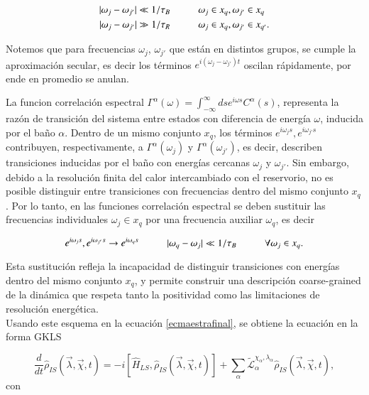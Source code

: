 \begin{align*}
    |\omega_{j}-\omega_{j'}| \ll 1/\tau_{B}  &\hspace{10mm} \omega_{j} \in x_{q}, \omega_{j'} \in x_{q} \\
    |\omega_{j}-\omega_{j'}| \gg 1/\tau_{R}  &\hspace{10mm} \omega_{j} \in x_{q}, \omega_{j'} \in x_{q'}.
\end{align*}

Notemos que para frecuencias $\omega_{j}$, $\omega_{j'}$ que están en distintos grupos, se cumple la aproximación secular, es decir los términos $e^{i(\omega_{j} - \omega_{j'})t}$ oscilan rápidamente, por ende en  promedio se anulan.

La funcion correlación  espectral $\Gamma^{\alpha}(\omega) = \int_{-\infty}^{\infty} ds e^{i \omega s} C^{\alpha}(s)$, representa la razón de transición del sistema entre estados con diferencia de energía $\omega$, inducida por el baño $\alpha$. Dentro de un mismo conjunto $x_{q}$, los términos $e^{i\omega_{j}s},e^{i\omega_{j'}s}$ contribuyen, respectivamente, a  $\Gamma^{\alpha}(\omega_{j})$ y $\Gamma^{\alpha}(\omega_{j'})$, es decir,  describen transiciones inducidas por el baño con energías cercanas $\omega_{j}$ y $\omega_{j'}$. Sin embargo, debido a la resolución finita del calor intercambiado con el reservorio, no es posible distinguir entre transiciones con frecuencias dentro del mismo conjunto $x_q$. Por lo tanto, en las funciones correlación espectral se deben sustituir las frecuencias individuales $\omega_{j} \in x_{q}$ por una frecuencia auxiliar $\omega_{q}$, es decir 

\begin{equation*}
    e^{i\omega_{j}s},e^{i\omega_{j'}s} \to e^{i\omega_{q}s} \hspace{10mm} |\omega_{q} - \omega_{j}| \ll 1/\tau_{B} \hspace{10mm} \forall \omega_{j} \in x_{q}.
\end{equation*}

Esta sustitución refleja la incapacidad de distinguir transiciones con energías dentro del mismo conjunto \( x_q \), y permite construir una descripción coarse-grained de la dinámica que respeta tanto la positividad como las limitaciones de resolución energética\cite{chruscinski2017brief}. \\
Usando este esquema en la ecuación \ref{ecmaestrafinal}, se obtiene la ecuación en la forma GKLS

\begin{equation*}
    \frac{d}{dt}\hat{\rho}_{IS}(\vec{\lambda},\vec{\chi},t) = -i[\hat{H}_{LS},\hat{\rho}_{IS}(\vec{\lambda},\vec{\chi},t)] + \sum_{\alpha}\tilde{\mathcal{L}}^{\chi_{\alpha},\lambda_{\alpha}}_{\alpha} \hat{\rho}_{IS}(\vec{\lambda},\vec{\chi},t),
\end{equation*}
con

